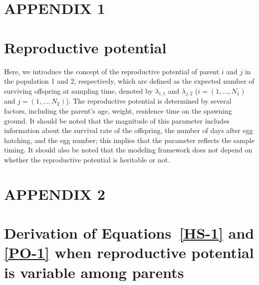 \documentclass[12pt, English]{article}
\begin{document}
\begin{spacing}{1.9}
\clearpage

\section*{APPENDIX 1}
\setcounter{equation}{0}
\renewcommand{\theequation}{A\arabic{equation}}

\section*{Reproductive potential}

\renewcommand{\theequation}{A\arabic{equation}}
Here, we introduce the concept of the reproductive potential of parent $i$ and $j$ in the population 1 and 2, respectively, which are defined as the expected number of surviving offspring at sampling time, denoted by $\lambda_{i,1}$ and $\lambda_{j,2}$ ($i=(1, \ldots, N_1)$ and $j=(1, \ldots, N_2)$). The reproductive potential is determined by several factors, including the parent's age, weight, residence time on the spawning ground. It should be noted that the magnitude of this parameter includes information about the survival rate of the offspring, the number of days after egg hatching, and the egg number; this implies that the parameter reflects the sample timing. It should also be noted that the modeling framework does not depend on whether the reproductive potential is heritable or not.

\section*{APPENDIX 2}
\section*{Derivation of Equations~\ref{HS-1} and \ref{PO-1} when reproductive potential is variable among parents}


\end{spacing}
\end{document}
